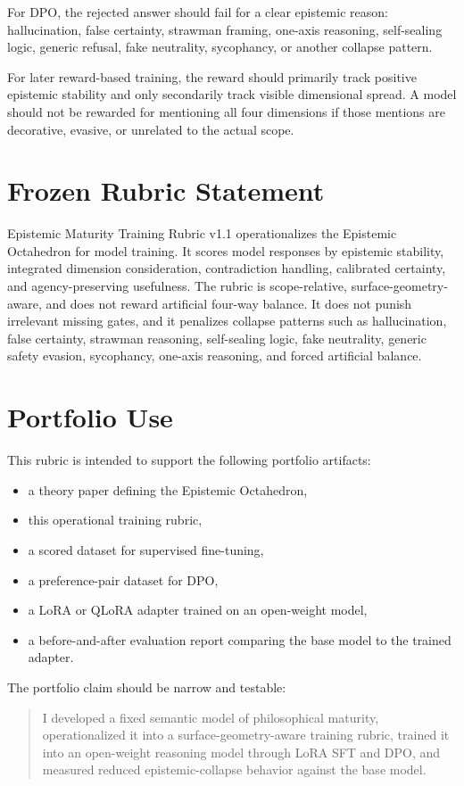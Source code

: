 \documentclass[11pt]{article}
\begin{document}
For DPO, the rejected answer should fail for a clear epistemic reason: hallucination, false certainty, strawman framing, one-axis reasoning, self-sealing logic, generic refusal, fake neutrality, sycophancy, or another collapse pattern.

For later reward-based training, the reward should primarily track positive epistemic stability and only secondarily track visible dimensional spread. A model should not be rewarded for mentioning all four dimensions if those mentions are decorative, evasive, or unrelated to the actual scope.

\section{Frozen Rubric Statement}

Epistemic Maturity Training Rubric v1.1 operationalizes the Epistemic Octahedron for model training. It scores model responses by epistemic stability, integrated dimension consideration, contradiction handling, calibrated certainty, and agency-preserving usefulness. The rubric is scope-relative, surface-geometry-aware, and does not reward artificial four-way balance. It does not punish irrelevant missing gates, and it penalizes collapse patterns such as hallucination, false certainty, strawman reasoning, self-sealing logic, fake neutrality, generic safety evasion, sycophancy, one-axis reasoning, and forced artificial balance.

\section{Portfolio Use}

This rubric is intended to support the following portfolio artifacts:

\begin{itemize}[leftmargin=1.5em]
  \item a theory paper defining the Epistemic Octahedron,
  \item this operational training rubric,
  \item a scored dataset for supervised fine-tuning,
  \item a preference-pair dataset for DPO,
  \item a LoRA or QLoRA adapter trained on an open-weight model,
  \item a before-and-after evaluation report comparing the base model to the trained adapter.
\end{itemize}

The portfolio claim should be narrow and testable:

\begin{quote}
I developed a fixed semantic model of philosophical maturity, operationalized it into a surface-geometry-aware training rubric, trained it into an open-weight reasoning model through LoRA SFT and DPO, and measured reduced epistemic-collapse behavior against the base model.
\end{quote}
\end{document}
